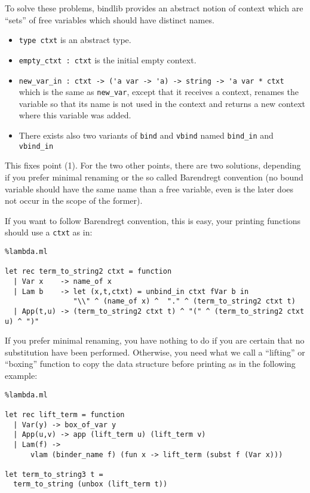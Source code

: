 \documentclass[11pt]{article}
\begin{document}
To solve these problems, bindlib provides an abstract notion of context
 which are ``sets'' of free variables which should have
 distinct names.
\begin{itemize}
\item\verb#type ctxt# is  an abstract type.
\item\verb#empty_ctxt : ctxt# is the initial empty context.
\item\verb#new_var_in : ctxt -> ('a var -> 'a) -> string -> 'a var * ctxt#\\
  which is the same as \verb#new_var#, except that it receives a
  context, renames the variable so that its name is not used in the
  context and returns a new context where this variable was added.
\item There exists also two variants of \verb#bind# and \verb#vbind#
  named \verb#bind_in# and \verb#vbind_in#
\end{itemize}

This fixes point (1). For the two other points, there are two solutions,
depending if you prefer minimal renaming or the so called Barendregt
convention (no bound variable should have the same name than a free
variable, even is the later does not occur in the scope of the
former).

If you want to follow Barendregt convention, this is easy, your
printing functions should use a \verb#ctxt# as in:

\begin{lstlisting}%lambda.ml

let rec term_to_string2 ctxt = function
  | Var x    -> name_of x
  | Lam b    -> let (x,t,ctxt) = unbind_in ctxt fVar b in
                "\\" ^ (name_of x) ^  "." ^ (term_to_string2 ctxt t)
  | App(t,u) -> (term_to_string2 ctxt t) ^ "(" ^ (term_to_string2 ctxt u) ^ ")"
\end{lstlisting}

If you prefer minimal renaming, you have nothing to do if you are
certain that no substitution have been performed. Otherwise, you need
what we call a ``lifting'' or ``boxing'' function to copy the data structure before
printing as in the following example:

\begin{lstlisting}%lambda.ml

let rec lift_term = function
  | Var(y) -> box_of_var y
  | App(u,v) -> app (lift_term u) (lift_term v)
  | Lam(f) ->
      vlam (binder_name f) (fun x -> lift_term (subst f (Var x)))

let term_to_string3 t =
  term_to_string (unbox (lift_term t))
\end{lstlisting}
\end{document}
